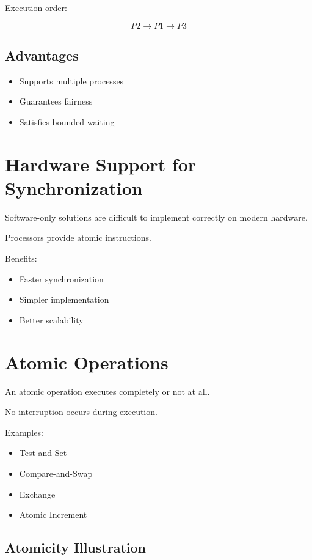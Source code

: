 Execution order:

\[
P2 \rightarrow P1 \rightarrow P3
\]

\subsection{Advantages}

\begin{itemize}
\item Supports multiple processes
\item Guarantees fairness
\item Satisfies bounded waiting
\end{itemize}

\section{Hardware Support for Synchronization}

Software-only solutions are difficult to implement correctly on modern hardware.

Processors provide atomic instructions.

Benefits:

\begin{itemize}
\item Faster synchronization
\item Simpler implementation
\item Better scalability
\end{itemize}

\section{Atomic Operations}

An atomic operation executes completely or not at all.

No interruption occurs during execution.

Examples:

\begin{itemize}
\item Test-and-Set
\item Compare-and-Swap
\item Exchange
\item Atomic Increment
\end{itemize}

\subsection{Atomicity Illustration}

